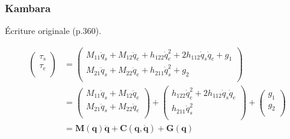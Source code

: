 \documentclass[pdftex,a4paper,11pt]{article}
\newcommand{\vs}[1]{\boldsymbol{#1}} %
\newcommand{\ms}[1]{\boldsymbol{#1}} %
\numberwithin{equation}{subsection}
\begin{document}

\subsubsection{Kambara}
Écriture originale \cite{kambara2009} (p.360).

\begin{align*}
    \begin{pmatrix}
        \tau_s \\
        \tau_e \\
    \end{pmatrix}
    & = \begin{pmatrix}
        M_{11}\ddot{q}_s + M_{12}\ddot{q}_e + h_{122}\dot{q}_e^2 + 2h_{112}\dot{q}_s\dot{q}_e + g_1 \\
        M_{21}\ddot{q}_s + M_{22}\ddot{q}_e + h_{211}\dot{q}_s^2 + g_2 \\
    \end{pmatrix}\\
    & = \begin{pmatrix}
        M_{11}\ddot{q}_s + M_{12}\ddot{q}_e \\
        M_{21}\ddot{q}_s + M_{22}\ddot{q}_e \\
    \end{pmatrix} +
    \begin{pmatrix}
        h_{122}\dot{q}_e^2 + 2h_{112}\dot{q}_s\dot{q}_e \\
        h_{211}\dot{q}_s^2 \\
    \end{pmatrix} +
    \begin{pmatrix}
        g_1 \\
        g_2 \\
    \end{pmatrix}\\
    & = \ms{M}(\vs{q}) \vs{\ddot{q}} + \vs{C}(\vs{q}, \vs{\dot{q}}) + \vs{G}(\vs{q})
\end{align*}
\end{document}
